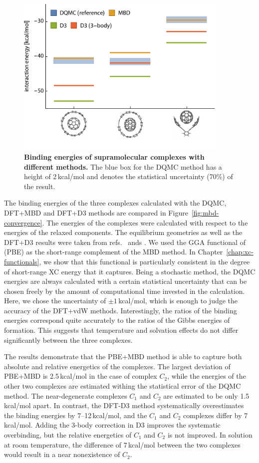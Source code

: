 \begin{figure}
\includegraphics[width=4in]{media/master-table.pdf}
\caption{\textbf{Binding energies of supramolecular complexes with different methods.}
The blue box for the DQMC method has a height of 2\,kcal/mol and denotes the statistical uncertainty (70\%) of the result.
}\label{fig:pipi-energies}
\end{figure}

The binding energies of the three complexes calculated with the DQMC, DFT+MBD and DFT+D3 methods are compared in Figure~\ref{fig:mbd-convergence}.
The energies of the complexes were calculated with respect to the energies of the relaxed components.
The equilibrium geometries as well as the DFT+D3 results were taken from refs.\ \cite{RisthausJCTC13} ands \citep{AntonyCC15}.
We used the GGA functional of \citet*{PerdewPRL96} (PBE) as the short-range complement of the MBD method.
In Chapter~\ref{chap:xc-functionals}, we show that this functional is particularly consistent in the degree of short-range XC energy that it captures.
Being a stochastic method, the DQMC energies are always calculated with a certain statistical uncertainty that can be chosen freely by the amount of computational time invested in the calculation.
Here, we chose the uncertainty of $\pm1$\,kcal/mol, which is enough to judge the accuracy of the DFT+vdW methods.
Interestingly, the ratios of the binding energies correspond quite accurately to the ratios of the Gibbs energies of formation.
This suggests that temperature and solvation effects do not differ significantly between the three complexes.

The results demonstrate that the PBE+MBD method is able to capture both absolute and relative energetics of the complexes.
The largest deviation of PBE+MBD is 2.5\,kcal/mol in the case of complex $C_2$, while the energies of the other two complexes are estimated withing the statistical error of the DQMC method.
The near-degenerate complexes $C_1$ and $C_2$ are estimated to be only 1.5\,kcal/mol apart.
In contrast, the DFT-D3 method systematically overestimates the binding energies by 7--12\,kcal/mol, and the $C_1$ and $C_2$ complexes differ by 7\,kcal/mol.
Adding the 3-body correction in D3 improves the systematic overbinding, but the relative energetics of $C_1$ and $C_2$ is not improved.
In solution at room temperature, the difference of 7\,kcal/mol between the two complexes would result in a near nonexistence of $C_2$.

